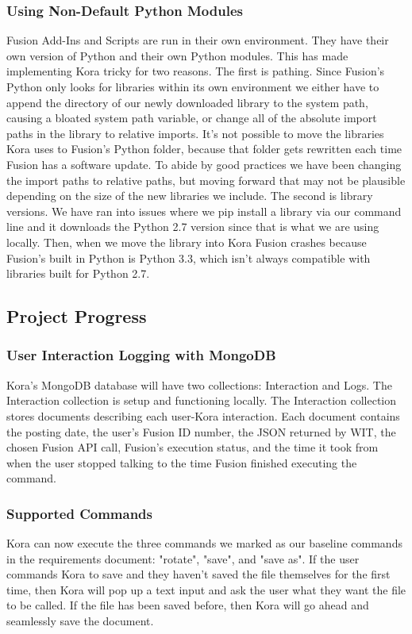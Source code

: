 \documentclass[onecolumn, draftclsnofoot,10pt, compsoc]{IEEEtran}
\begin{document}
    
	    \subsubsection{Using Non-Default Python Modules}
		    Fusion Add-Ins and Scripts are run in their own environment.
		    They have their own version of Python and their own Python modules.
		    This has made implementing Kora tricky for two reasons.
		    The first is pathing.
		    Since Fusion's Python only looks for libraries within its own environment we either have to append the directory of our newly downloaded library to the system path, causing a bloated system path variable, or change all of the absolute import paths in the library to relative imports.
		    It's not possible to move the libraries Kora uses to Fusion's Python folder, because that folder gets rewritten each time Fusion has a software update.
		    To abide by good practices we have been changing the import paths to relative paths, but moving forward that may not be plausible depending on the size of the new libraries we include.
		    The second is library versions.
		    We have ran into issues where we pip install a library via our command line and it downloads the Python 2.7 version since that is what we are using locally.
		    Then, when we move the library into Kora Fusion crashes because Fusion's built in Python is Python 3.3, which isn't always compatible with libraries built for Python 2.7.

		
	\subsection{Project Progress}
		\subsubsection{User Interaction Logging with MongoDB}
			Kora's MongoDB database will have two collections: Interaction and Logs.
			The Interaction collection is setup and functioning locally.
			The Interaction collection stores documents describing each user-Kora interaction.
			Each document contains the posting date, the user's Fusion ID number, the JSON returned by WIT, the chosen Fusion API call, Fusion's execution status, and the time it took from when the user stopped talking to the time Fusion finished executing the command.
			
			
		\subsubsection{Supported Commands}
			Kora can now execute the three commands we marked as our baseline commands in the requirements document: "rotate", "save", and "save as".
			If the user commands Kora to save and they haven't saved the file themselves for the first time, then Kora will pop up a text input and ask the user what they want the file to be called.
			If the file has been saved before, then Kora will go ahead and seamlessly save the document.
			
\end{document}
